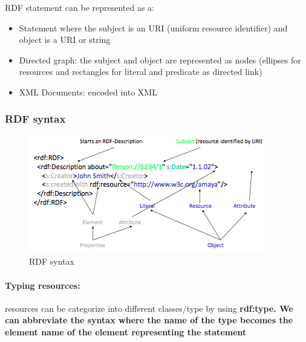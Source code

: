RDF statement can be represented as a:
\begin{itemize}
\item Statement where the subject is an URI (uniform resource identifier) and object is a URI or string
\item Directed graph: the subject and object are represented as nodes (ellipses for resources and rectangles for literal and predicate as directed link)
\item XML Documents: encoded into XML
\end{itemize}

\subsubsection{RDF syntax}
\begin{figure}[H]
\begin{center}
\includegraphics[width=1\linewidth]{figures/rdf.png}
\end{center}
\caption{RDF syntax}
\end{figure}

\paragraph{Typing resources:} resources can be categorize into different classes/type by using \bf{rdf:type}. We can abbreviate the syntax where the name of the type becomes the element name of the element representing the statement

